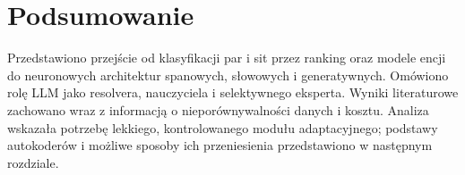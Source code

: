 \section{Podsumowanie}

Przedstawiono przejście od klasyfikacji par i sit przez ranking oraz modele encji do neuronowych architektur spanowych, słowowych i generatywnych. Omówiono rolę LLM jako resolvera, nauczyciela i selektywnego eksperta. Wyniki literaturowe zachowano wraz z informacją o nieporównywalności danych i kosztu. Analiza wskazała potrzebę lekkiego, kontrolowanego modułu adaptacyjnego; podstawy autokoderów i możliwe sposoby ich przeniesienia przedstawiono w następnym rozdziale.
